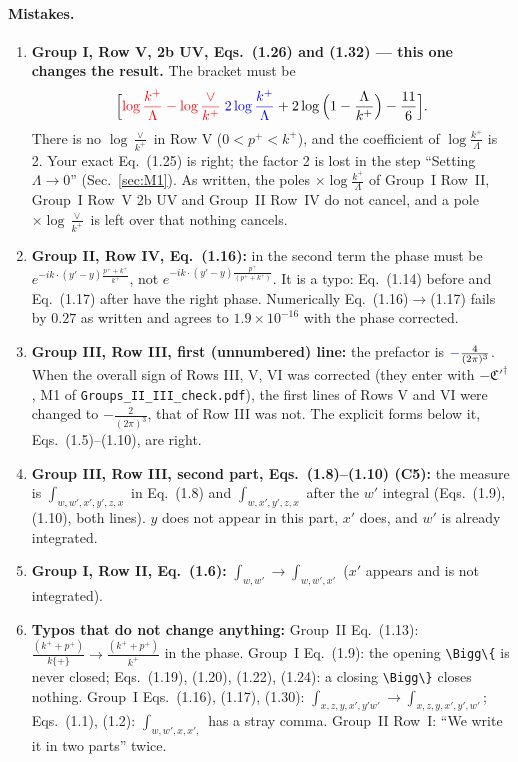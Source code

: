 \documentclass[10pt]{article}
\newcommand{\new}[1]{{\color{blue}#1}}
\newcommand{\old}[1]{{\color{red}#1}}
\begin{document}
\paragraph{Mistakes.}
\begin{enumerate}
\item[\textbf{M1}] \textbf{Group I, Row V, 2b UV, Eqs.~(1.26) and (1.32) --- this one changes the result.} The bracket must be
\begin{equation*}
\Big[\old{\log\frac{k^+}{\Lambda}-\log\frac{\vee}{k^+}}\;\new{2\log\frac{k^+}{\Lambda}}+2\log\Big(1-\frac{\Lambda}{k^+}\Big)-\frac{11}{6}\Big].
\end{equation*}
There is no $\log\frac{\vee}{k^+}$ in Row V ($0<p^+<k^+$), and the coefficient of $\log\frac{k^+}{\Lambda}$ is 2. Your exact Eq.~(1.25) is right; the factor 2 is lost in the step ``Setting $\Lambda\to0$'' (Sec.~\ref{sec:M1}). As written, the poles $\times\log\frac{k^+}{\Lambda}$ of Group~I Row~II, Group~I Row~V 2b UV and Group~II Row~IV do not cancel, and a pole $\times\log\frac{\vee}{k^+}$ is left over that nothing cancels.
\item[\textbf{M2}] \textbf{Group II, Row IV, Eq.~(1.16):} in the second term the phase must be $e^{-ik\cdot(y'-y)\frac{p^++k^+}{k^+}}$, not $e^{-ik\cdot(y'-y)\frac{p^+}{(p^++k^+)}}$. It is a typo: Eq.~(1.14) before and Eq.~(1.17) after have the right phase. Numerically Eq.~(1.16)$\to$(1.17) fails by $0.27$ as written and agrees to $1.9\times10^{-16}$ with the phase corrected.
\item[\textbf{M3}] \textbf{Group III, Row III, first (unnumbered) line:} the prefactor is $\new{-}\frac{4}{(2\pi)^3}$. When the overall sign of Rows III, V, VI was corrected (they enter with $-\mathfrak C'^\dagger$, M1 of \texttt{Groups\_II\_III\_check.pdf}), the first lines of Rows V and VI were changed to $-\frac{2}{(2\pi)^3}$, that of Row III was not. The explicit forms below it, Eqs.~(1.5)--(1.10), are right.
\item[\textbf{M4}] \textbf{Group III, Row III, second part, Eqs.~(1.8)--(1.10) (C5):} the measure is $\int_{w,w',x',y',z,x}$ in Eq.~(1.8) and $\int_{w,x',y',z,x}$ after the $w'$ integral (Eqs.~(1.9), (1.10), both lines). $y$ does not appear in this part, $x'$ does, and $w'$ is already integrated.
\item[\textbf{M5}] \textbf{Group I, Row II, Eq.~(1.6):} $\int_{w,w'}\to\int_{w,w',x'}$ ($x'$ appears and is not integrated).
\item[\textbf{M6}] \textbf{Typos that do not change anything:} Group~II Eq.~(1.13): $\frac{(k^++p^+)}{k\{+\}}\to\frac{(k^++p^+)}{k^+}$ in the phase. Group~I Eq.~(1.9): the opening \texttt{\textbackslash Bigg\textbackslash\{} is never closed; Eqs.~(1.19), (1.20), (1.22), (1.24): a closing \texttt{\textbackslash Bigg\textbackslash\}} closes nothing. Group~I Eqs.~(1.16), (1.17), (1.30): $\int_{x,z,y,x',y'w'}\to\int_{x,z,y,x',y',w'}$; Eqs.~(1.1), (1.2): $\int_{w,w',x,x',}$ has a stray comma. Group~II Row~I: ``We write it in two parts'' twice.
\end{enumerate}
\end{document}
